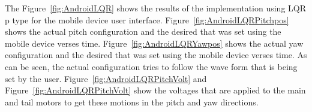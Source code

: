 The Figure~\ref{fig:AndroidLQR} shows the results of the implementation using LQR p type for the mobile device user interface.  Figure~\ref{fig:AndroidLQRPitchpos} shows the actual pitch configuration and the desired that was set using the mobile device verses time.  Figure~\ref{fig:AndroidLQRYawpos} shows the actual yaw configuration and the desired that was set using the mobile device verses time.  As can be seen, the actual configuration tries to follow the wave form that is being set by the user.  Figure~\ref{fig:AndroidLQRPitchVolt} and Figure~\ref{fig:AndroidLQRPitchVolt} show the voltages that are applied to the main and tail motors to get these motions in the pitch and yaw directions.
\begin{figure}
    \centering
\end{figure}
